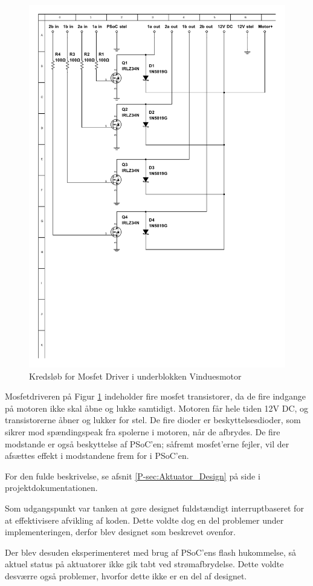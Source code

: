 \begin{figure}[h]
\centering 
\includegraphics[width={\textwidth-1cm}, trim= 40 260 0 40, clip=true] {../fig/multisim_vinduesmotor_mosfetdriver.pdf}
\caption{Kredsløb for Mosfet Driver i underblokken Vinduesmotor}
\label{fig:multisim_vinduesmotor_mosfetdriver}
\end{figure}

Mosfetdriveren på Figur \ref{fig:multisim_vinduesmotor_mosfetdriver} indeholder fire mosfet transistorer, da de fire indgange på motoren ikke skal åbne og lukke samtidigt. 
Motoren får hele tiden 12V DC, og transistorerne åbner og lukker for stel.
De fire dioder er beskyttelsesdioder, som sikrer mod spændingspeak fra spolerne i motoren, når de afbrydes. 
De fire modstande er også beskyttelse af PSoC'en; såfremt mosfet'erne fejler, vil der afsættes effekt i modstandene frem for i PSoC'en.

For den fulde beskrivelse, se afsnit \ref{P-sec:Aktuator_Design}  på side \pageref{P-sec:Aktuator_Design} i projektdokumentationen.

\mbox{}

Som udgangspunkt var tanken at gøre designet fuldstændigt interruptbaseret for at effektivisere afvikling af koden.
Dette voldte dog en del problemer under implementeringen, derfor blev designet som beskrevet ovenfor. 

Der blev desuden eksperimenteret med brug af PSoC'ens flash hukommelse, så aktuel status på aktuatorer ikke gik tabt ved strømafbrydelse. 
Dette voldte desværre også problemer, hvorfor dette ikke er en del af designet.


\clearpage